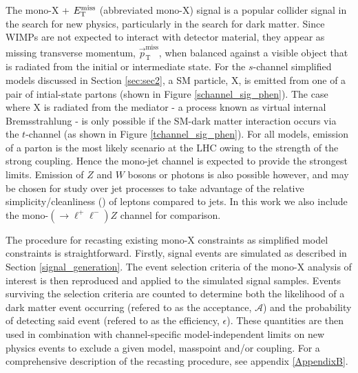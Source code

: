 The mono-X + $E_{\mathrm{T}}^{\mathrm{miss}}$ (abbreviated mono-X) signal is a popular collider signal in the search for new physics, particularly in the search for dark matter. Since WIMPs are not expected to interact with detector material, they appear as missing transverse momentum, $\vec{p}_{\mathrm{T}}^{\mathrm{miss}}$, when balanced against a visible object that is radiated from the initial or intermediate state. 
For the $s$-channel simplified models discussed in Section \ref{sec:sec2}, a SM particle, X, is emitted from one of a pair of intial-state partons (shown in Figure \ref{schannel_sig_phen}). The case where X is radiated from the mediator - a process known as virtual internal Bremsstrahlung - is only possible if the SM-dark matter interaction occurs via the $t$-channel (as shown in Figure \ref{tchannel_sig_phen}). 
For all models, emission of a parton is the most likely scenario at the LHC owing to the strength of the strong coupling. Hence the mono-jet channel is expected to provide the strongest limits. Emission of $Z$ and $W$ bosons or photons is also possible however, and may be chosen for study over jet processes to take advantage of the relative simplicity/cleanliness () of leptons compared to jets. In this work we also include the mono-$(\rightarrow \ell^+ \ell^-)Z$ channel for comparison.




The procedure for recasting existing mono-X constraints as simplified model constraints is straightforward. Firstly, signal events are simulated as described in Section \ref{signal_generation}. The event selection criteria of the mono-X analysis of interest is then reproduced and applied to the simulated signal samples. Events surviving the selection criteria are counted to determine both the likelihood of a dark matter event occurring (refered to as the acceptance, $\mathcal{A}$) and the probability of detecting said event (refered to as the efficiency, $\epsilon$). These quantities are then used in combination with channel-specific model-independent limits on new physics events to exclude a given model, masspoint and/or coupling. For a comprehensive description of the recasting procedure, see appendix \ref{AppendixB}.

